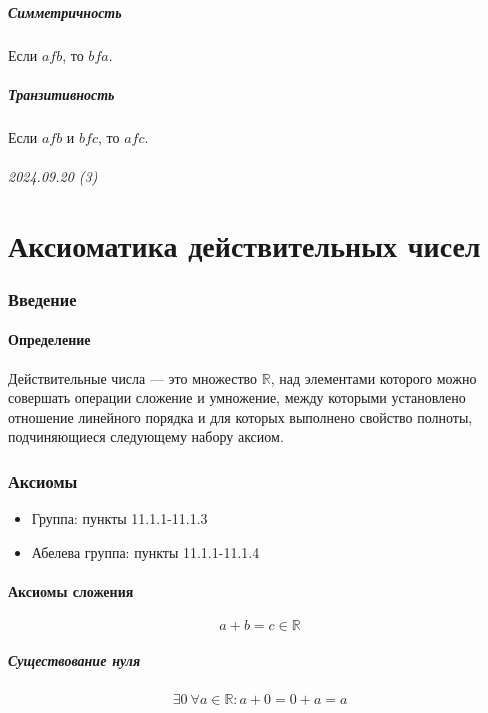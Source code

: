 \documentclass{article}
\begin{document}
\subsubsection{Симметричность}
Если $a f b$, то $b f a$.

\subsubsection{Транзитивность}
Если $a f b$ и $b f c$, то $a f c$.




\newpage
\paragraph{2024.09.20 (3)}
\part{Аксиоматика действительных чисел}

\section{Введение}

\subsection{Определение}
Действительные числа --- это множество $\mathbb{R}$, над элементами которого можно совершать операции сложение и умножение, 
между которыми установлено отношение линейного порядка и для которых выполнено свойство полноты,
подчиняющиеся следующему набору аксиом.



\section{Аксиомы}
\begin{itemize}
    \item Группа: пункты 11.1.1-11.1.3
    \item Абелева группа: пункты 11.1.1-11.1.4
\end{itemize}

\subsection{Аксиомы сложения}
\[
    a + b = c \in \mathbb{R}
\]  

\subsubsection{Существование нуля}
\[
    \exists 0 ~ \forall a \in \mathbb{R}: a + 0 = 0 + a = a
\]
\end{document}
